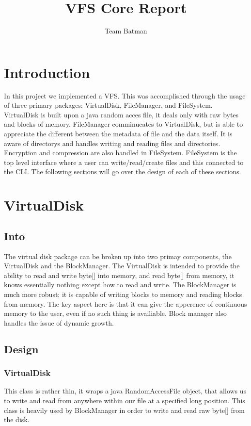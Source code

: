 \documentclass[12pt]{article}
\begin{document}
\title{VFS Core Report}
\author{Team Batman}
\maketitle

\section{Introduction}
In this project we implemented a VFS.  This was accomplished through the usage of three primary packages: VirtualDisk, FileManager, and FileSystem.  VirtualDisk is built upon a java random acces file, it deals only with raw bytes and blocks of memory.  FileManager comminucates to VirtualDisk, but is able to appreciate the different between the metadata of file and the data itself.  It is aware of directorys and handles writing and reading files and directories.  Encryption and compression are also handled in FileSystem.  FileSystem is the top level interface where a user can write/read/create files and this connected to the CLI.  The following sections will go over the design of each of these sections.

\section{VirtualDisk}

\subsection{Into}
The virtual disk package can be broken up into two primay components, the VirtualDisk and the BlockManager.  The VirtualDisk is intended to provide the ability to read and write byte[] into memory, and read byte[] from memory, it knows essentially nothing except how to read and write.  The BlockManager is much more robust; it is capable of writing blocks to memory and reading blocks from memory.  The key aspect here is that it can give the apperence of continuous memory to the user, even if no such thing is availiable.  Block manager also handles the issue of dynamic growth. 

\subsection{Design}

\subsubsection{VirtualDisk}
This class is rather thin, it wraps a java RandomAccessFile object, that allows us to write and read from anywhere within our file at a specified long position.  This class is heavily used by BlockManager in order to write and read raw byte[] from the disk.
\end{document}
